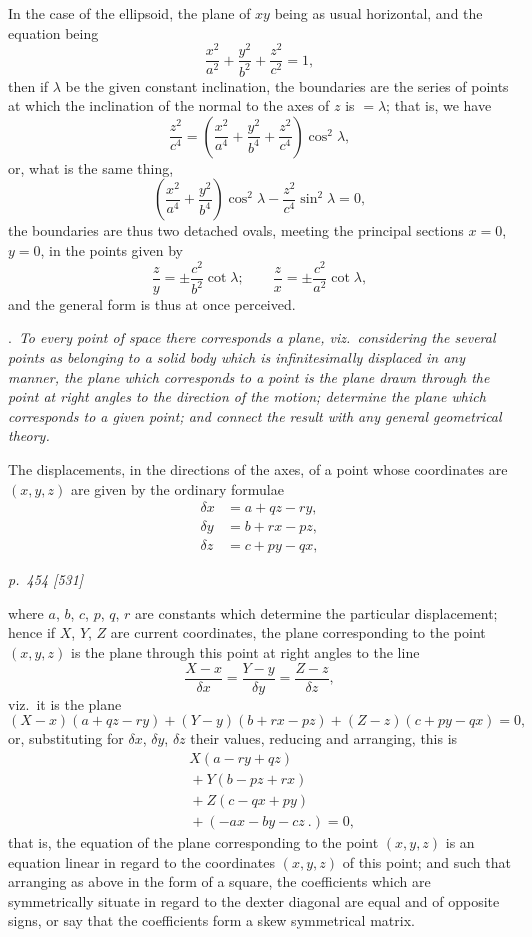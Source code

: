 \documentclass[11pt,a4paper]{article}
\theoremstyle{plain}
\theoremstyle{definition}
\begin{document}
In the case of the ellipsoid, the plane of $xy$ being as usual horizontal, and the
equation being
\[
\frac{x^2}{a^2} + \frac{y^2}{b^2} + \frac{z^2}{c^2} = 1,
\]
then if $\lambda$ be the given constant inclination, the boundaries are the series of points
at which the inclination of the normal to the axes of $z$ is $= \lambda$; that is, we have
\[
\frac{z^2}{c^4}
=\left(\frac{x^2}{a^4}+\frac{y^2}{b^4}+\frac{z^2}{c^4}\right)\cos^2\lambda,
\]
or, what is the same thing,
\[
\left(\frac{x^2}{a^4}+\frac{y^2}{b^4}\right)\cos^2\lambda-\frac{z^2}{c^4}\sin^2\lambda=0,
\]
the boundaries are thus two detached ovals, meeting the principal sections $x=0$, $y=0$,
in the points given by
\[
\frac{z}{y}=\pm\frac{c^2}{b^2}\cot\lambda;\qquad
\frac{z}{x}=\pm\frac{c^2}{a^2}\cot\lambda,
\]
and the general form is thus at once perceived.

\medskip
{}.\ \textit{To every point of space there corresponds a plane, viz.\ considering the several
points as belonging to a solid body which is infinitesimally displaced in any manner,
the plane which corresponds to a point is the plane drawn through the point at right
angles to the direction of the motion; determine the plane which corresponds to a given
point; and connect the result with any general geometrical theory.}

\medskip
The displacements, in the directions of the axes, of a point whose coordinates are
$(x, y, z)$ are given by the ordinary formulae
\begin{align*}
\delta x &= a + q z - r y, \\
\delta y &= b + r x - p z, \\
\delta z &= c + p y - q x,
\end{align*}

\clearpage

\bigskip
\textit{p.~454 [531]}
\smallskip

\noindent
where $a$, $b$, $c$, $p$, $q$, $r$ are constants which determine the particular displacement; hence if $X$, $Y$, $Z$ are current coordinates, the plane corresponding to the point $(x, y, z)$ is
the plane through this point at right angles to the line
\[
\frac{X-x}{\delta x}=\frac{Y-y}{\delta y}=\frac{Z-z}{\delta z},
\]
viz.\ it is the plane
\[
(X - x) (a + qz - ry) + (Y - y) (b + rx - pz) + (Z - z) (c + py - qx) = 0,
\]
or, substituting for $\delta x$, $\delta y$, $\delta z$ their values, reducing and arranging, this is
\begin{align*}
&\quad X(a - r y + q z) \\
&\quad + Y(b - p z + r x) \\
&\quad + Z(c - q x + p y) \\
&\quad +(-ax-by-cz\ .)=0,
\end{align*}
that is, the equation of the plane corresponding to the point $(x, y, z)$ is an equation
linear in regard to the coordinates $(x, y, z)$ of this point; and such that arranging as
above in the form of a square, the coefficients which are symmetrically situate in
regard to the dexter diagonal are equal and of opposite signs, or say that the
coefficients form a skew symmetrical matrix.
\end{document}
